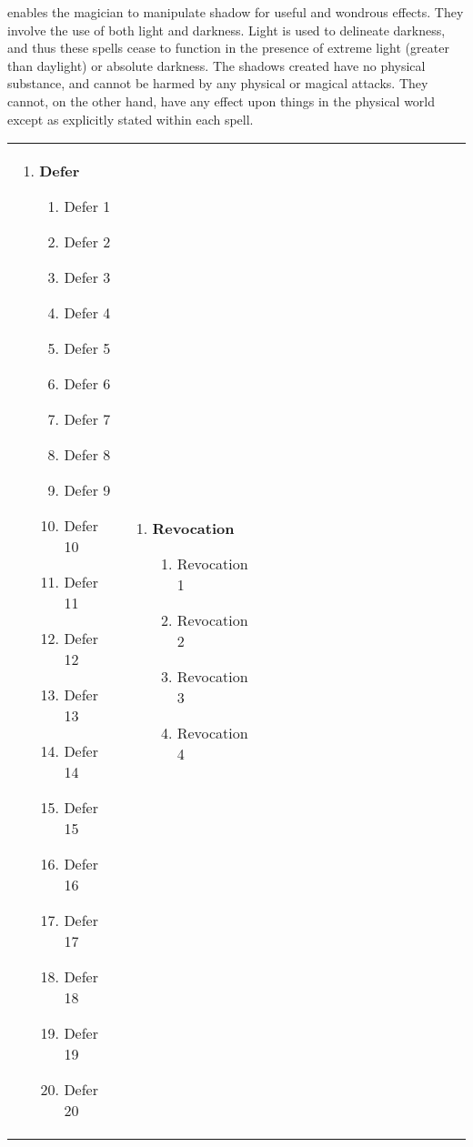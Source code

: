  enables the magician to manipulate shadow for useful and wondrous effects. They involve the use of both light and darkness. Light is used to delineate darkness, and thus these spells cease to function in the presence of extreme
light (greater than daylight) or absolute darkness. The shadows created have no physical substance, and cannot be harmed by any physical or magical attacks. They cannot, on the other hand, have any effect upon things in the physical world except as explicitly stated within each spell.

\renewcommand{\labelenumii}{\arabic{enumii}.}
\begin{tabular}{@{} p{0.25\linewidth} p{0.25\linewidth} p{0.25\linewidth} p{0.25\linewidth}}
\begin{enumerate}
	\item \textbf{Defer}
	\begin{enumerate}
		\item Defer 1
		\item Defer 2
		\item Defer 3
		\item Defer 4
		\item Defer 5
		\item Defer 6
		\item Defer 7
		\item Defer 8
		\item Defer 9
		\item Defer 10
		\item Defer 11
		\item Defer 12
		\item Defer 13
		\item Defer 14
		\item Defer 15
		\item Defer 16
		\item Defer 17
		\item Defer 18
		\item Defer 19
		\item Defer 20
	\end{enumerate}
\end{enumerate} &
\begin{enumerate}
	\item \textbf{Revocation}
	\begin{enumerate}
		\item Revocation 1
		\item Revocation 2
		\item Revocation 3
		\item Revocation 4

\end{enumerate}
\end{enumerate}
\end{tabular}
